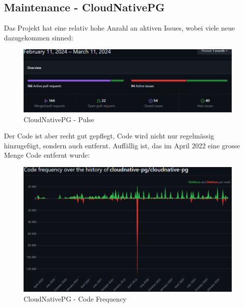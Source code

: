 
\begin{flushleft}
    \subsection{Maintenance - CloudNativePG}
    \label{subsec:maintenance_cloudnativepg}
    Das Projekt hat eine relativ hohe Anzahl an aktiven Issues, wobei viele neue dazugekommen sinned:
    \begin{figure}[H]
        \centering
        \includegraphics[width=0.75\linewidth]{source/implementation/evaluation/postgresql_ha_solutions/insights/cloudnativepg/pulse_cloudnative-pg_cloudnative-pg}
        \caption{CloudNativePG - Pulse}
        \label{fig:pulse_cloudnative-pg_cloudnative-pg}
    \end{figure}

    Der Code ist aber recht gut gepflegt, Code wird nicht nur regelmässig hinzugefügt, sondern auch entfernt.
    Auffällig ist, das im April 2022 eine grosse Menge Code entfernt wurde:
    \begin{figure}[H]
        \centering
        \includegraphics[width=0.75\linewidth]{source/implementation/evaluation/postgresql_ha_solutions/insights/cloudnativepg/code_frequency_cloudnative-pg_cloudnative-pg}
        \caption{CloudNativePG - Code Frequency}
        \label{fig:code_frequency_cloudnative-pg_cloudnative-pg}
    \end{figure}


\end{flushleft}
